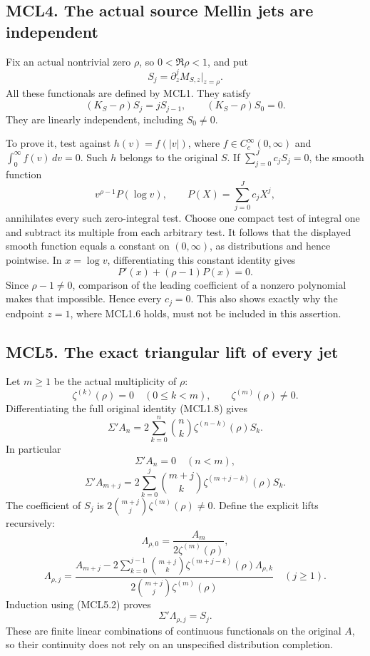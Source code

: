 \subsection{MCL4. The actual source Mellin jets are
independent}\label{mcl4.-the-actual-source-mellin-jets-are-independent}

Fix an actual nontrivial zero \(\rho\), so \(0<\Re\rho<1\), and put \[
 S_j=\partial_z^jM_{S,z}\big|_{z=\rho}.
\] All these functionals are defined by MCL1. They satisfy \[
 (K_S-\rho)S_j=jS_{j-1},\qquad (K_S-\rho)S_0=0.
 \tag{MCL4.1}
\] They are linearly independent, including \(S_0\ne0\).

To prove it, test against \(h(v)=f(|v|)\), where
\(f\in C_c^\infty(0,\infty)\) and \(\int_0^\infty f(v)\,dv=0\). Such
\(h\) belongs to the original \(S\). If \(\sum_{j=0}^Jc_jS_j=0\), the
smooth function \[
 v^{\rho-1}P(\log v),\qquad P(X)=\sum_{j=0}^Jc_jX^j,
\] annihilates every such zero-integral test. Choose one compact test of
integral one and subtract its multiple from each arbitrary test. It
follows that the displayed smooth function equals a constant on
\((0,\infty)\), as distributions and hence pointwise. In \(x=\log v\),
differentiating this constant identity gives \[
 P'(x)+(\rho-1)P(x)=0.
\] Since \(\rho-1\ne0\), comparison of the leading coefficient of a
nonzero polynomial makes that impossible. Hence every \(c_j=0\). This
also shows exactly why the endpoint \(z=1\), where MCL1.6 holds, must
not be included in this assertion.

\subsection{MCL5. The exact triangular lift of every
jet}\label{mcl5.-the-exact-triangular-lift-of-every-jet}

Let \(m\ge1\) be the actual multiplicity of \(\rho\): \[
 \zeta^{(k)}(\rho)=0\quad(0\le k<m),\qquad
 \zeta^{(m)}(\rho)\ne0.
\] Differentiating the full original identity (MCL1.8) gives \[
 \Sigma'A_n
 =2\sum_{k=0}^n\binom nk
       \zeta^{(n-k)}(\rho)S_k .
 \tag{MCL5.1}
\] In particular \[
 \Sigma'A_n=0\quad(n<m),
\] \[
 \boxed{\Sigma'A_{m+j}
 =2\sum_{k=0}^j\binom{m+j}{k}
       \zeta^{(m+j-k)}(\rho)S_k.}
 \tag{MCL5.2}
\] The coefficient of \(S_j\) is
\(2\binom{m+j}{j}\zeta^{(m)}(\rho)\ne0\). Define the explicit lifts
recursively: \[
 \Lambda_{\rho,0}=\frac{A_m}{2\zeta^{(m)}(\rho)},
\] \[
 \boxed{
 \Lambda_{\rho,j}
 =
 \frac{A_{m+j}
 -2\sum_{k=0}^{j-1}\binom{m+j}{k}
       \zeta^{(m+j-k)}(\rho)\Lambda_{\rho,k}}
 {2\binom{m+j}{j}\zeta^{(m)}(\rho)}\quad(j\ge1).
 }
 \tag{MCL5.3}
\] Induction using (MCL5.2) proves \[
 \Sigma'\Lambda_{\rho,j}=S_j.
 \tag{MCL5.4}
\] These are finite linear combinations of continuous functionals on the
original \(A\), so their continuity does not rely on an unspecified
distribution completion.

